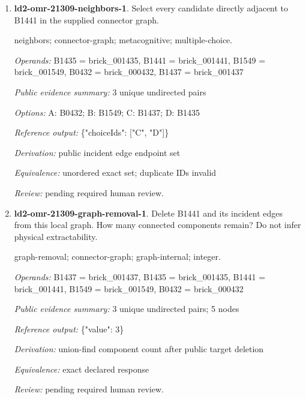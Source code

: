 \begin{enumerate}
\par{\small interface; connector-graph; metacognitive; single-choice.\par\textit{Operands:} B0965 = brick\_000965, B0967 = brick\_000967\par\textit{Public evidence summary:} \{"connectorRecord": \{"family": "stud", "aConnector": 13, "bConnector": 3\}, "scope": "Upstream connector tolerances and inset mesh intersections; unknown parts remain explicit, separate scene objects are not glued together; no load/force validation."\}\par\textit{Options:} A: axle; B: hinge; C: stud; D: ball; E: fixed\par\textit{Reference output:} \{"choiceId": "C"\}\par\textit{Derivation:} public connectorRecord.family equality\par\textit{Equivalence:} exact declared response\par\textit{Review:} machine checks passed; no human certification.}
\item \textbf{ld2-omr-21309-neighbors-1}. Select every candidate directly adjacent to B1441 in the supplied connector graph.
\par{\small neighbors; connector-graph; metacognitive; multiple-choice.\par\textit{Operands:} B1435 = brick\_001435, B1441 = brick\_001441, B1549 = brick\_001549, B0432 = brick\_000432, B1437 = brick\_001437\par\textit{Public evidence summary:} 3 unique undirected pairs\par\textit{Options:} A: B0432; B: B1549; C: B1437; D: B1435\par\textit{Reference output:} \{"choiceIds": ["C", "D"]\}\par\textit{Derivation:} public incident edge endpoint set\par\textit{Equivalence:} unordered exact set; duplicate IDs invalid\par\textit{Review:} pending required human review.}
\item \textbf{ld2-omr-21309-graph-removal-1}. Delete B1441 and its incident edges from this local graph. How many connected components remain? Do not infer physical extractability.
\par{\small graph-removal; connector-graph; graph-internal; integer.\par\textit{Operands:} B1437 = brick\_001437, B1435 = brick\_001435, B1441 = brick\_001441, B1549 = brick\_001549, B0432 = brick\_000432\par\textit{Public evidence summary:} 3 unique undirected pairs; 5 nodes\par\textit{Reference output:} \{"value": 3\}\par\textit{Derivation:} union-find component count after public target deletion\par\textit{Equivalence:} exact declared response\par\textit{Review:} pending required human review.}

\end{enumerate}
